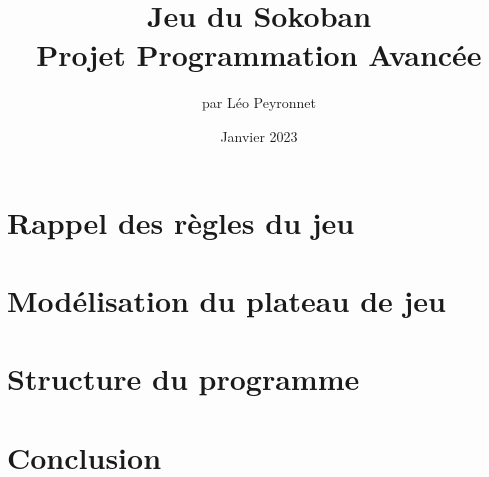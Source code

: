 \documentclass[10pt,a4paper,french,titlepage]{article}
\author{par Léo Peyronnet}
\title{Jeu du Sokoban\\[1ex] \large Projet Programmation Avancée}
\date{Janvier 2023}
\begin{document}
\maketitle
\tableofcontents
\section{Rappel des règles du jeu}
\section{Modélisation du plateau de jeu}
\section{Structure du programme}
\section{Conclusion}
\end{document}
